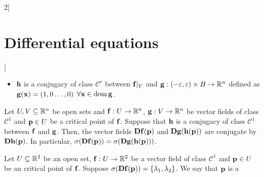 \documentclass[../../../main.tex]{subfiles}
\begin{document}
\begin{multicols}{2}[\section{Differential equations}]
\begin{theorem}
\begin{itemize}
      \item $\boldsymbol{\mathrm{h}}$ is a conjugacy of class $\mathcal{C}^r$ between $\boldsymbol{\mathrm{f}}|_V$ and $\boldsymbol{\mathrm{g}}:(-\varepsilon,\varepsilon)\times B\rightarrow\mathbb{R}^n$ defined as $\boldsymbol{\mathrm{g}}(\boldsymbol{\mathrm{x}})=(1,0\ldots,0)$ $\forall \boldsymbol{\mathrm{x}}\in\operatorname{dom}\boldsymbol{\mathrm{g}}$.
    \end{itemize}
  \end{theorem}
  \begin{lemma}
    Let $U,V\subseteq \mathbb{R}^n$ be open sets and $\boldsymbol{\mathrm{f}}:U\rightarrow\mathbb{R}^n$, $\boldsymbol{\mathrm{g}}:V\rightarrow\mathbb{R}^n$ be vector fields of class $\mathcal{C}^1$ and $\boldsymbol{\mathrm{p}}\in U$ be a critical point of $\boldsymbol{\mathrm{f}}$. Suppose that $\boldsymbol{\mathrm{h}}$ is a conjugacy of class $\mathcal{C}^1$ between $\boldsymbol{\mathrm{f}}$ and $\boldsymbol{\mathrm{g}}$. Then, the vector fields $\boldsymbol{\mathrm{Df}}(\boldsymbol{\mathrm{p}})$ and $\boldsymbol{\mathrm{Dg}}(\boldsymbol{\mathrm{h}}(\boldsymbol{\mathrm{p}}))$ are conjugate by $\boldsymbol{\mathrm{Dh}}(\boldsymbol{\mathrm{p}})$. In particular, $\sigma(\boldsymbol{\mathrm{Df}}(\boldsymbol{\mathrm{p}}))=\sigma(\boldsymbol{\mathrm{Dg}}(\boldsymbol{\mathrm{h}}(\boldsymbol{\mathrm{p}})))$.
  \end{lemma}
  \begin{definition}
    Let $U\subseteq \mathbb{R}^2$ be an open set, $\boldsymbol{\mathrm{f}}:U\rightarrow\mathbb{R}^2$ be a vector field of class $\mathcal{C}^1$ and $\boldsymbol{\mathrm{p}}\in U$ be an critical point of $\boldsymbol{\mathrm{f}}$. Suppose $\sigma(\boldsymbol{\mathrm{Df}}(\boldsymbol{\mathrm{p}}))=\{\lambda_1,\lambda_2\}$. We say that $\boldsymbol{\mathrm{p}}$ is a
\end{definition}
\end{multicols}
\end{document}

